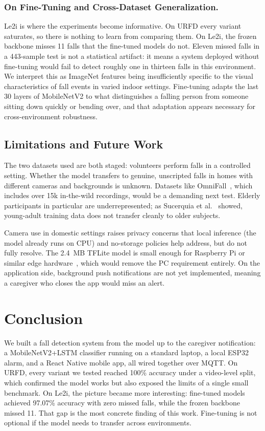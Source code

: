 \documentclass[runningheads]{llncs}
\begin{document}
\subsubsection{On Fine-Tuning and Cross-Dataset Generalization.}
Le2i is where the experiments become informative. On URFD every variant saturates, so there is nothing to learn from comparing them. On Le2i, the frozen backbone misses 11 falls that the fine-tuned models do not. Eleven missed falls in a 443-sample test is not a statistical artifact: it means a system deployed without fine-tuning would fail to detect roughly one in thirteen falls in this environment. We interpret this as ImageNet features being insufficiently specific to the visual characteristics of fall events in varied indoor settings. Fine-tuning adapts the last 30 layers of MobileNetV2 to what distinguishes a falling person from someone sitting down quickly or bending over, and that adaptation appears necessary for cross-environment robustness.

\subsection{Limitations and Future Work}

The two datasets used are both staged: volunteers perform falls in a controlled setting. Whether the model transfers to genuine, unscripted falls in homes with different cameras and backgrounds is unknown. Datasets like OmniFall~\cite{sigurdsson2025}, which includes over 15k in-the-wild recordings, would be a demanding next test. Elderly participants in particular are underrepresented; as Sucerquia et al.~\cite{sisfall2017} showed, young-adult training data does not transfer cleanly to older subjects.

Camera use in domestic settings raises privacy concerns that local inference (the model already runs on CPU) and no-storage policies help address, but do not fully resolve. The 2.4~MB TFLite model is small enough for Raspberry Pi or similar edge hardware~\cite{guo2025}, which would remove the PC requirement entirely. On the application side, background push notifications are not yet implemented, meaning a caregiver who closes the app would miss an alert.

\section{Conclusion}

We built a fall detection system from the model up to the caregiver notification: a MobileNetV2+LSTM classifier running on a standard laptop, a local ESP32 alarm, and a React Native mobile app, all wired together over MQTT. On URFD, every variant we tested reached 100\% accuracy under a video-level split, which confirmed the model works but also exposed the limits of a single small benchmark. On Le2i, the picture became more interesting: fine-tuned models achieved 97.07\% accuracy with zero missed falls, while the frozen backbone missed 11. That gap is the most concrete finding of this work. Fine-tuning is not optional if the model needs to transfer across environments.
\end{document}
